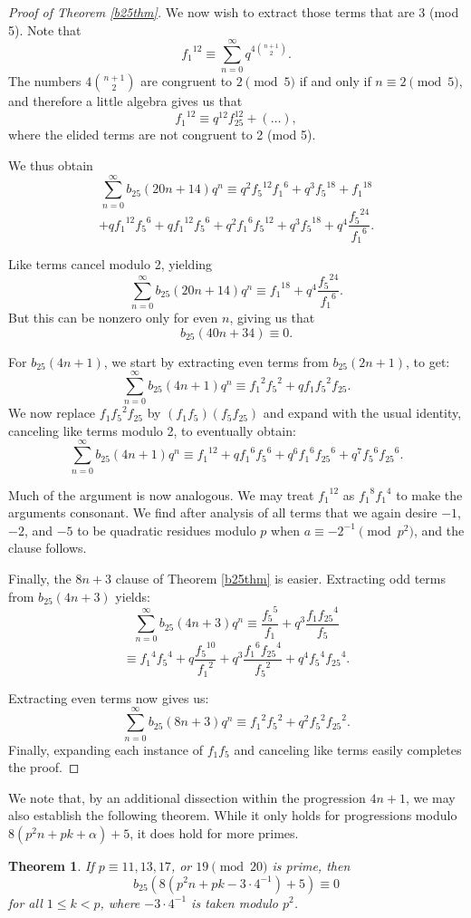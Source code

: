 \documentclass[12pt]{amsart}
\newtheorem{theorem}{Theorem}%
\theoremstyle{definition}
\begin{document}
\begin{proof}[Proof of Theorem \ref{b25thm}]
We now wish to extract those terms that are 3 (mod 5). Note that
$${f_1}^{12} \equiv \sum_{n=0}^\infty q^{4 \binom{n+1}{2}}.$$ The  numbers $4\binom{n+1}{2}$ are  congruent to $2 \pmod{5}$ if and only if $n \equiv 2 \pmod{5}$, and therefore a little algebra gives us that $${f_1}^{12} \equiv q^{12} f_{25}^{12} + ( \dots ),$$ \noindent where the elided terms are not congruent to 2 (mod 5).

We thus obtain $$\sum_{n=0}^\infty b_{25} (20n+14) q^n \equiv q^2 {f_5}^{12} {f_1}^6 + q^3 {f_5}^{18} + {f_1}^{18}$$$$ + q {f_1}^{12} {f_5}^6 + q {f_1}^{12} {f_5}^6 + q^2 {f_1}^6 {f_5}^{12} + q^3 {f_5}^{18} + q^4 \frac{{f_5}^{24}}{{f_1}^6}.$$

Like terms cancel modulo 2, yielding
$$\sum_{n=0}^\infty b_{25} (20n+14) q^n \equiv {f_1}^{18} + q^4 \frac{{f_5}^{24}}{{f_1}^6}.$$
But this can be nonzero only for even $n$, giving us that
$$b_{25}(40n + 34) \equiv 0 .$$

For $b_{25}(4n+1)$, we start by extracting even terms from $b_{25}(2n+1)$, to get:
$$\sum_{n=0}^\infty b_{25}(4n+1) q^n \equiv {f_1}^2 {f_5}^2 + q f_1 {f_5}^2 f_{25}.$$
We now replace $f_1 {f_5}^2 f_{25}$ by $(f_1 f_5)(f_5 f_{25})$ and expand with the usual identity, canceling like terms modulo 2, to eventually obtain:
$$\sum_{n=0}^\infty b_{25}(4n+1) q^n \equiv {f_1}^{12} + q {f_1}^6 {f_5}^6 + q^6 {f_1}^6 {f_{25}}^6 + q^7 {f_5}^6 {f_{25}}^6.$$

Much of the argument is now analogous.  We may treat ${f_1}^{12}$ as ${f_1}^8 {f_1}^4$ to make the arguments consonant.  We find after analysis of all terms that we again desire $-1$, $-2$, and $-5$ to be quadratic residues modulo $p$ when $a \equiv -2^{-1} \pmod{p^2}$, and the clause follows.

Finally, the $8n+3$ clause of Theorem \ref{b25thm} is easier.  Extracting odd terms from $b_{25}(4n+3)$ yields:
$$\sum_{n=0}^\infty b_{25}(4n+3) q^n \equiv \frac{{f_5}^5}{f_1} + q^3 \frac{f_1 {f_{25}}^4}{f_5} $$$$\equiv {f_1}^4 {f_5}^4 + q \frac{{f_5}^{10}}{{f_1}^2} + q^3 \frac{{f_1}^6 {f_{25}}^4}{{f_5}^2} + q^4 {f_5}^4 {f_{25}}^4.$$

Extracting even terms now gives us:
$$\sum_{n=0}^\infty b_{25}(8n+3) q^n \equiv {f_1}^2 {f_5}^2 + q^2 {f_5}^2 {f_{25}}^2.$$  Finally, expanding each instance of $f_1 f_5$ and canceling like terms easily completes the proof.
\end{proof}

We note that, by an additional dissection within the progression $4n+1$, we may also establish the following theorem. While it only holds for progressions modulo $8(p^2 n + pk + \alpha) + 5$, it does hold for more primes.
\begin{theorem}\label{twentyfive8} If $p \equiv 11, 13, 17$, or $19 \pmod{20}$ is prime, then $$b_{25}(8(p^2n+pk - 3 \cdot 4^{-1}) + 5) \equiv 0 $$ for all $1 \leq k < p$, where $-3 \cdot 4^{-1}$ is taken modulo $p^2$.
\end{theorem}
\end{document}
